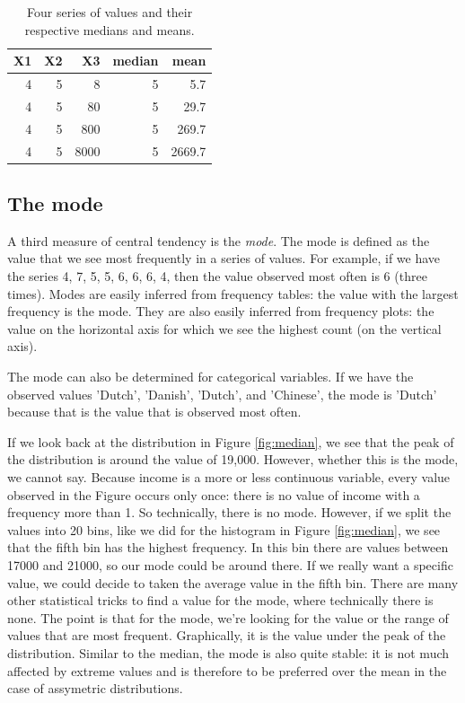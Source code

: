 \documentclass[]{book}\usepackage[]{graphicx}\usepackage[]{color}
\begin{document}
\begin{table}[ht]
\centering
\caption{Four series of values and their respective medians and means.} 
\label{tab:median_2}
\begin{tabular}{rrrrr}
  \hline
X1 & X2 & X3 & median & mean \\ 
  \hline
4 & 5 & 8 & 5 & 5.7 \\ 
  4 & 5 & 80 & 5 & 29.7 \\ 
  4 & 5 & 800 & 5 & 269.7 \\ 
  4 & 5 & 8000 & 5 & 2669.7 \\ 
   \hline
\end{tabular}
\end{table}




\subsection{The mode}
A third measure of central tendency is the \textit{mode}. The mode is defined as the value that we see most frequently in a series of values. For example, if we have the series 4, 7, 5, 5, 6, 6, 6, 4, then the value observed most often is 6 (three times). Modes are easily inferred from frequency tables: the value with the largest frequency is the mode. They are also easily inferred from frequency plots: the value on the horizontal axis for which we see the highest count (on the vertical axis).

The mode can also be determined for categorical variables. If we have the observed values  'Dutch', 'Danish', 'Dutch', and 'Chinese', the mode is 'Dutch' because that is the value that is observed most often.

If we look back at the distribution in Figure \ref{fig:median}, we see that the peak of the distribution is around the value of 19,000. However, whether this is the mode, we cannot say. Because income is a more or less continuous variable, every value observed in the Figure occurs only once: there is no value of income with a frequency more than 1. So technically, there is no mode. However, if we split the values into 20 bins, like we did for the histogram in Figure \ref{fig:median}, we see that the fifth bin has the highest frequency. In this bin there are values between 17000 and 21000, so our mode could be around there. If we really want a specific value, we could decide to taken the average value in the fifth bin. There are many other statistical tricks to find a value for the mode, where technically there is none. The point is that for the mode, we're looking for the value or the range of values that are most frequent. Graphically, it is the value under the peak of the distribution. Similar to the median, the mode is also quite stable: it is not much affected by extreme values and is therefore to be preferred over the mean in the case of assymetric distributions.
\end{document}
